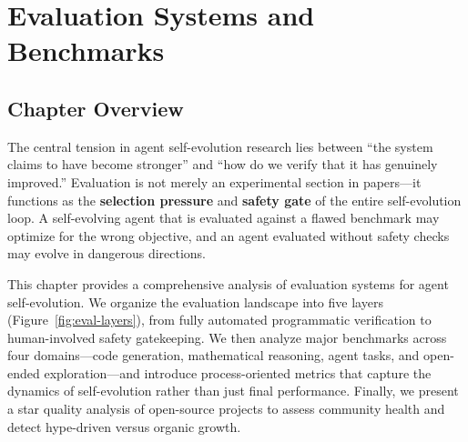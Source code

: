 
\section{Evaluation Systems and Benchmarks}\label{ch:evaluation}

\subsection{Chapter Overview}\label{sec:ch5-overview}

The central tension in agent self-evolution research lies between ``the system claims to have become stronger'' and ``how do we verify that it has genuinely improved.'' Evaluation is not merely an experimental section in papers---it functions as the \textbf{selection pressure} and \textbf{safety gate} of the entire self-evolution loop. A self-evolving agent that is evaluated against a flawed benchmark may optimize for the wrong objective, and an agent evaluated without safety checks may evolve in dangerous directions.

This chapter provides a comprehensive analysis of evaluation systems for agent self-evolution. We organize the evaluation landscape into five layers (Figure~\ref{fig:eval-layers}), from fully automated programmatic verification to human-involved safety gatekeeping. We then analyze major benchmarks across four domains---code generation, mathematical reasoning, agent tasks, and open-ended exploration---and introduce process-oriented metrics that capture the dynamics of self-evolution rather than just final performance. Finally, we present a star quality analysis of open-source projects to assess community health and detect hype-driven versus organic growth.

